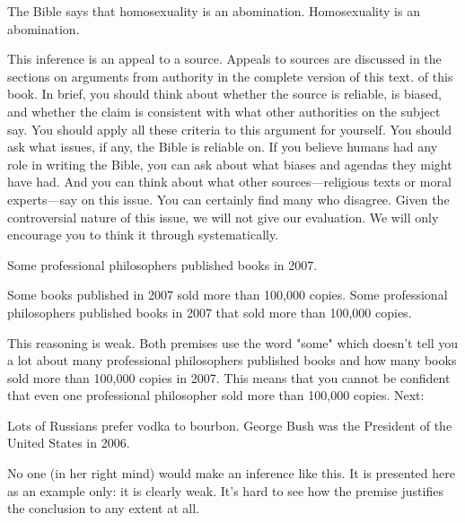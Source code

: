 \begin{earg*}
\item  The Bible says that homosexuality is an abomination.
\itemc  Homosexuality is an abomination.
\end{earg*}

This inference is an appeal to a source. Appeals to sources are discussed in the sections on arguments from authority in the complete version of this text. \label{ver_var}  of this book. In brief, you should think about whether the source is reliable, is biased, and whether the claim is consistent with what other authorities on the subject say. You should apply all these criteria to this argument for yourself. You should ask what issues, if any, the Bible is reliable on. If you believe humans had any role in writing the Bible, you can ask about what biases and agendas they might have had. And you can think about what other sources---religious texts or moral experts---say on this issue. You can certainly find many who disagree. Given the controversial nature of this issue, we will not give our evaluation. We will only encourage you to think it through systematically.


\begin{earg*}
\item  Some professional philosophers published books in 2007.
\item  Some books published in 2007 sold more than 100,000 copies. 
\itemc  Some professional philosophers published books in 2007 that sold more than 100,000 copies. 
\end{earg*}

This reasoning is weak. Both premises use the word "some" which doesn't tell you a lot about many professional philosophers published books and how many books sold more than 100,000 copies in 2007. This means that you cannot be confident that even one professional philosopher sold more than 100,000 copies. Next:

\begin{earg*}
\item  Lots of Russians prefer vodka to bourbon. 
\itemc  George Bush was the President of the United States in 2006.
\end{earg*}

No one (in her right mind) would make an inference like this. It is presented here as an example only: it is clearly weak. It's hard to see how the premise justifies the conclusion to any extent at all.  
      
